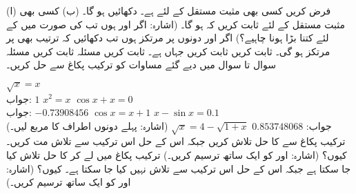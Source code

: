 (ا) فرض کریں کسی بھی مثبت مستقل  کے لئے  ہے۔ دکھائیں  ہو گا۔ (ب) کسی بھی مثبت مستقل  کے لئے ثابت کریں کہ  ہو گا۔ (اشارہ: اگر  اور  ہوں تب  کی صورت میں  کے لئے  کتنا بڑا ہونا چاہیے؟)
اگر  اور  دونوں  پر مرتکز ہوں تب دکھائیں کہ ترتیب  بھی  پر مرتکز ہو گی۔
ثابت کریں 
ثابت کریں  جہاں  ہے۔
ثابت کریں مسئلہ 
ثابت کریں مسئلہ 
\\
سوال  تا سوال  میں دیے گئے مساوات کو ترکیب پکاغ سے حل کریں۔

$\sqrt{x}=x$\\
جواب:\quad
$1$
$x^2=x$
$\cos x+x=0$\\
جواب:\quad
$-0.73908456$
$\cos x=x+1$
$x-\sin x=0.1$\\
جواب:\quad
$0.853748068$
$\sqrt{x}=4-\sqrt{1+x}$\quad
(اشارہ: پہلے دونوں اطراف کا مربع لیں۔)
ترکیب پکاغ سے  کا حل  تلاش کریں جبکہ اس کے حل  اس ترکیب سے تلاش مت کریں۔ کیوں؟ (اشارہ:  اور  کو ایک ساتھ ترسیم کریں۔)
ترکیب پکاغ میں  لے کر  کا حل   تلاش کیا جا سکتا ہے جبکہ اس کے حل  اس ترکیب سے تلاش نہیں کیا جا سکتا ہے۔ کیوں؟ (اشارہ:  اور  کو ایک ساتھ ترسیم کریں۔)

